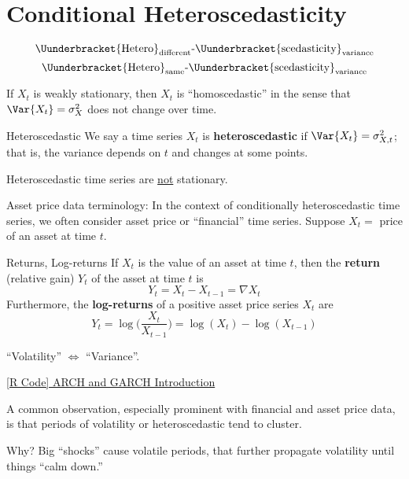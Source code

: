 \section{Conditional Heteroscedasticity}
\[ \Uunderbracket{\text{Hetero}}_{\text{different}}\text{-}\Uunderbracket{\text{scedasticity}}_{\text{variance}} \]
\[ \Uunderbracket{\text{Hetero}}_{\text{same}}\text{-}\Uunderbracket{\text{scedasticity}}_{\text{variance}} \]
\begin{Example}{}{}
    If $ X_t $ is weakly stationary, then $ X_t $ is ``homoscedastic''
    in the sense that $ \Var{X_t}=\sigma_X^2 $ does not change over time.
\end{Example}
\begin{Definition}{Heteroscedastic}{}
    We say a time series $ X_t $ is \textbf{heteroscedastic}
    if $ \Var{X_t}=\sigma_{X,t}^2 $; that is, the variance
    depends on $ t $ and changes at some points.
\end{Definition}
\begin{Remark}{}{}
    Heteroscedastic time series are \underline{not} stationary.
\end{Remark}
Asset price data terminology: In the context of conditionally
heteroscedastic time series, we often consider asset price or ``financial''
time series. Suppose $ X_t= $ price of an asset at time $ t $.
\begin{Definition}{Returns, Log-returns}{}
    If $ X_t $ is the value of an asset at time $ t $, then
    the \textbf{return} (relative gain) $ Y_t $ of the
    asset at time $ t $ is
    \[ Y_t=X_t-X_{t-1}=\nabla X_t \]
    Furthermore, the \textbf{log-returns}
    of a positive asset price series $ X_t $
    are
    \[ Y_t=\log\biggl(\frac{X_t}{X_{t-1}} \biggr)=\log(X_t)-\log(X_{t-1}) \]
\end{Definition}
\begin{Remark}{}{}
    ``Volatility'' $ \iff $ ``Variance''.
\end{Remark}
\href{https://github.com/Hextical/university-notes/blob/master/year-3/semester-2/STAT%20443/code/8.3%20-%20ARCH%20and%20GARCH%20Introduction.R}{[R Code] ARCH and GARCH Introduction}

A common observation, especially prominent with financial and asset
price data, is that periods of volatility or heteroscedastic
tend to cluster.

Why? Big ``shocks'' cause volatile periods, that further propagate
volatility until things ``calm down.''

